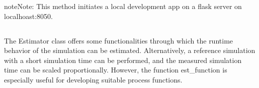 \documentclass[letterpaper,10pt,english]{sphinxmanual}
\begin{document}
\begin{fulllineitems}
\begin{fulllineitems}
\begin{quote}
\begin{description}
\end{description}\end{quote}

\begin{sphinxadmonition}{note}{Note:}
\sphinxAtStartPar
This method initiates a local development app on a flask server on localhoast:8050.
\end{sphinxadmonition}

\end{fulllineitems}


\end{fulllineitems}



\subsection{}
\label{\detokenize{source/API/api:estimator}}
\sphinxAtStartPar
The Estimator class offers some functionalities through which the runtime behavior of the simulation can be estimated.
Alternatively, a reference simulation with a short simulation time can be performed, and the measured simulation time
can be scaled proportionally. However, the function est\_function is especially useful for developing suitable process
functions.

\label{\detokenize{source/API/api:module-estimator}}
\end{document}
